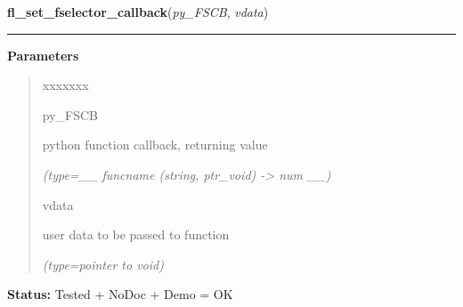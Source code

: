 \hspace{.8\funcindent}\begin{boxedminipage}{\funcwidth}

    \raggedright \textbf{fl\_set\_fselector\_callback}(\textit{py\_FSCB}, \textit{vdata})

    \vspace{-1.5ex}

    \rule{\textwidth}{0.5\fboxrule}
\setlength{\parskip}{2ex}
\setlength{\parskip}{1ex}
      \textbf{Parameters}
      \vspace{-1ex}

      \begin{quote}
        \begin{Ventry}{xxxxxxx}

          \item[py\_FSCB]

          python function callback, returning value

            {\it (type=\_\_ funcname (string, ptr\_void) -{\textgreater} num \_\_)}

          \item[vdata]

          user data to be passed to function

            {\it (type=pointer to void)}

        \end{Ventry}

      \end{quote}

\textbf{Status:} Tested + NoDoc + Demo = OK



    \end{boxedminipage}

    \label{xformslib:flgoodies:fl_set_fselector_callback}

    \vspace{0.5ex}

